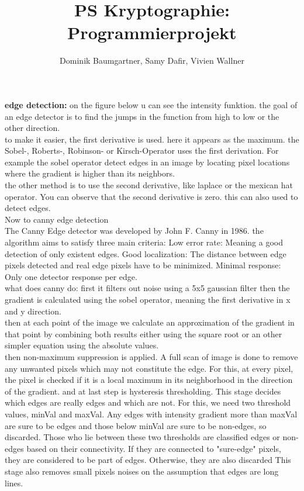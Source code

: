 \documentclass[12pt, a4paper]{article}
\title{PS Kryptographie: Programmierprojekt}
\author{Dominik Baumgartner, Samy Dafir, Vivien Wallner}
\date{}
\begin{document}
\textbf{edge detection:}
on the figure below u can see the intensity funktion. the goal of an edge detector is to find the jumps in the function from high to low or the other direction.
\\
to make it easier, the first derivative is used. here it appears as the maximum.
the Sobel-, Roberts-, Robinson- or Kirsch-Operator uses the first derivation.
For example the sobel operator detect edges in an image by locating pixel locations where the gradient is higher than its neighbors.
\\
the other method is to use the second derivative, like laplace or the mexican hat operator. You can observe that the second derivative is zero. this can also used to detect edges.
\\
Now to canny edge detection\\
The Canny Edge detector was developed by John F. Canny in 1986. the algorithm aims to satisfy three main criteria:
Low error rate: Meaning a good detection of only existent edges.
Good localization: The distance between edge pixels detected and real edge pixels have to be minimized.
Minimal response: Only one detector response per edge.\\

what does canny do:
first it filters out noise using a 5x5 gaussian filter
then the gradient is calculated using the sobel operator, meaning the first derivative in x and y direction. \\
then at each point of the image we calculate an approximation of the gradient in that point by combining both results either using the square root or an other simpler equation using the absolute values.\\
then non-maximum suppression is applied. A full scan of image is done to remove any unwanted pixels which may not constitute the edge. For this, at every pixel, the pixel is checked if it is a local maximum in its neighborhood in the direction of the gradient.
and at last step is hysteresis thresholding. This stage decides which edges are really edges and which are not. For this, we need two threshold values, minVal and maxVal. Any edges with intensity gradient more than maxVal are sure to be edges and those below minVal are sure to be non-edges, so discarded. Those who lie between these two thresholds are classified edges or non-edges based on their connectivity. If they are connected to "sure-edge" pixels, they are considered to be part of edges. Otherwise, they are also discarded
This stage also removes small pixels noises on the assumption that edges are long lines.
\end{document}
